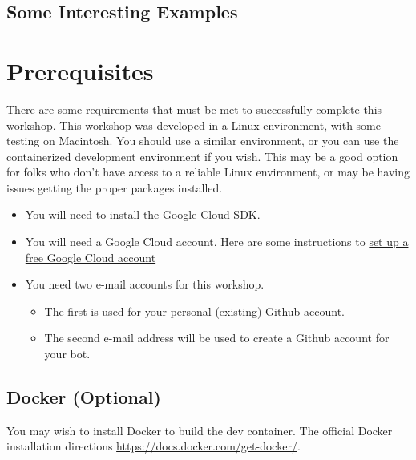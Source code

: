\subsection{\label{sec:interesting}Some Interesting Examples}

\section{\label{sec:preparation}Prerequisites}

\justifying
There are some requirements that must be met to successfully complete this workshop. This workshop was developed in a Linux environment, with some testing on Macintosh. You should use a similar environment, or you can use the containerized development environment if you wish. This may be a good option for folks who don't have access to a reliable Linux environment, or may be having issues getting the proper packages installed.

\begin{raggedright}
    \begin{itemize}
        \item You will need to \href{https://cloud.google.com/sdk/docs/install}{install the Google Cloud SDK}.
        \item You will need a Google Cloud account. Here are some instructions to \href{https://cloud.google.com/free/}{set up a free Google Cloud account}
        \item You need two e-mail accounts for this workshop.
        \begin{itemize}
            \item The first is used for your personal (existing) Github account.
            \item The second e-mail address will be used to create a Github account for your bot.
	   \end{itemize}
    \end{itemize}
\end{raggedright}
\vspace{2mm}

\subsection{\label{sec:docker}Docker (Optional)}

\justifying
You may wish to install Docker to build the dev container. The official Docker installation directions \href{can be found on their website}{https://docs.docker.com/get-docker/}.

